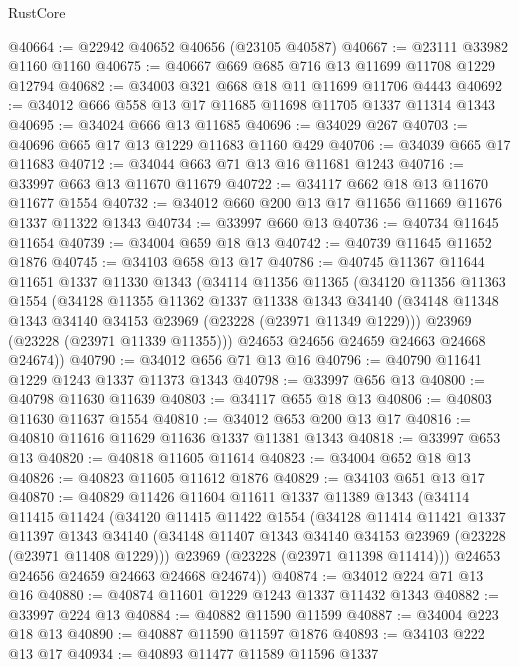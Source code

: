 \begin{lexlean}{RustCore}
\begin{coremodule}
@40664 := @22942 @40652 @40656 (@23105 @40587)
@40667 := @23111 @33982 @1160 @1160
@40675 := @40667 @669 @685 @716 @13 @11699 @11708 @1229 @12794
@40682 := @34003 @321 @668 @18 @11 @11699 @11706 @4443
@40692 := @34012 @666 @558 @13 @17 @11685 @11698 @11705 @1337 @11314 @1343
@40695 := @34024 @666 @13 @11685
@40696 := @34029 @267
@40703 := @40696 @665 @17 @13 @1229 @11683 @1160 @429
@40706 := @34039 @665 @17 @11683
@40712 := @34044 @663 @71 @13 @16 @11681 @1243
@40716 := @33997 @663 @13 @11670 @11679
@40722 := @34117 @662 @18 @13 @11670 @11677 @1554
@40732 := @34012 @660 @200 @13 @17 @11656 @11669 @11676 @1337 @11322 @1343
@40734 := @33997 @660 @13
@40736 := @40734 @11645 @11654
@40739 := @34004 @659 @18 @13
@40742 := @40739 @11645 @11652 @1876
@40745 := @34103 @658 @13 @17
@40786 := @40745
    @11367
    @11644
    @11651
    @1337
    @11330
    @1343
    (@34114
      @11356
      @11365
      (@34120
        @11356
        @11363
        @1554
        (@34128
          @11355
          @11362
          @1337
          @11338
          @1343
          @34140
          (@34148 @11348 @1343 @34140 @34153 @23969 (@23228 (@23971 @11349 @1229)))
          @23969
          (@23228 (@23971 @11339 @11355)))
        @24653
        @24656
        @24659
        @24663
        @24668
        @24674))
@40790 := @34012 @656 @71 @13 @16
@40796 := @40790 @11641 @1229 @1243 @1337 @11373 @1343
@40798 := @33997 @656 @13
@40800 := @40798 @11630 @11639
@40803 := @34117 @655 @18 @13
@40806 := @40803 @11630 @11637 @1554
@40810 := @34012 @653 @200 @13 @17
@40816 := @40810 @11616 @11629 @11636 @1337 @11381 @1343
@40818 := @33997 @653 @13
@40820 := @40818 @11605 @11614
@40823 := @34004 @652 @18 @13
@40826 := @40823 @11605 @11612 @1876
@40829 := @34103 @651 @13 @17
@40870 := @40829
    @11426
    @11604
    @11611
    @1337
    @11389
    @1343
    (@34114
      @11415
      @11424
      (@34120
        @11415
        @11422
        @1554
        (@34128
          @11414
          @11421
          @1337
          @11397
          @1343
          @34140
          (@34148 @11407 @1343 @34140 @34153 @23969 (@23228 (@23971 @11408 @1229)))
          @23969
          (@23228 (@23971 @11398 @11414)))
        @24653
        @24656
        @24659
        @24663
        @24668
        @24674))
@40874 := @34012 @224 @71 @13 @16
@40880 := @40874 @11601 @1229 @1243 @1337 @11432 @1343
@40882 := @33997 @224 @13
@40884 := @40882 @11590 @11599
@40887 := @34004 @223 @18 @13
@40890 := @40887 @11590 @11597 @1876
@40893 := @34103 @222 @13 @17
@40934 := @40893
    @11477
    @11589
    @11596
    @1337

\end{coremodule}
\end{lexlean}
